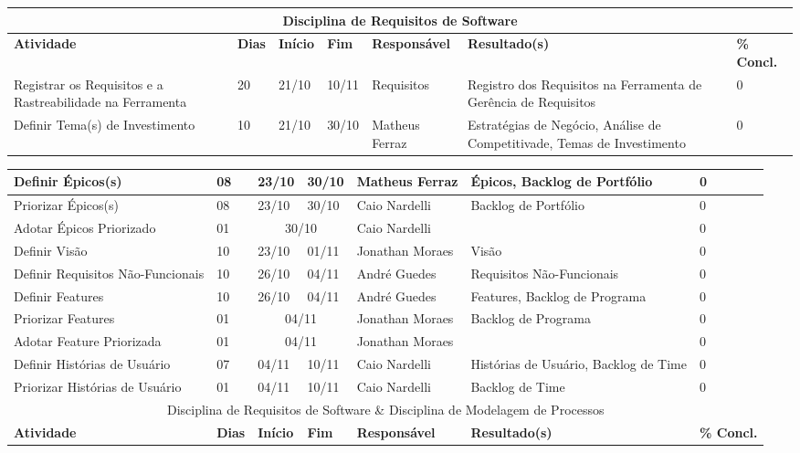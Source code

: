 \begin{landscape}
\begin{center}
\begin{tabular}{|m{6cm}|m{1cm}|m{1cm}|m{1cm}|m{4cm}|m{6cm}|m{2cm}|}
			\multicolumn{7}{|c|}{Disciplina de Requisitos de Software} \\
			\hline
			\textbf{Atividade} & \textbf{Dias} & \textbf{Início} & \textbf{Fim} & \textbf{Responsável} & \textbf{Resultado(s)} & \textbf{\% Concl.} \\ \hline
			Registrar os Requisitos e a Rastreabilidade na Ferramenta & 20 & 21/10 & 10/11 & Requisitos & Registro dos Requisitos na Ferramenta de Gerência de Requisitos & 0 \\ \hline
			Definir Tema(s) de Investimento & 10 & 21/10 & 30/10 & Matheus Ferraz & Estratégias de Negócio, Análise de Competitivade, Temas de Investimento & 0 \\ \hline
			\end{tabular}
		\end{center}
		\begin{center}
			\begin{tabular}{|m{6cm}|m{1cm}|m{1cm}|m{1cm}|m{4cm}|m{6cm}|m{2cm}|}
			\hline
			Definir Épicos(s) & 08 & 23/10 & 30/10 & Matheus Ferraz & Épicos, Backlog de Portfólio & 0 \\ \hline
			Priorizar Épicos(s) & 08 & 23/10 & 30/10 & Caio Nardelli & Backlog de Portfólio & 0 \\ \hline
			Adotar Épicos Priorizado & 01 & \multicolumn{2}{c|}{30/10} & Caio Nardelli & & 0 \\ \hline
			Definir Visão & 10 & 23/10 & 01/11 & Jonathan Moraes & Visão & 0 \\ \hline
			Definir Requisitos Não-Funcionais & 10 & 26/10 & 04/11 & André Guedes & Requisitos Não-Funcionais & 0 \\ \hline
			Definir Features & 10 & 26/10 & 04/11 & André Guedes & Features, Backlog de Programa & 0 \\ \hline
			Priorizar Features & 01 & \multicolumn{2}{c|}{04/11} & Jonathan Moraes & Backlog de Programa & 0 \\ \hline
			Adotar Feature Priorizada & 01 & \multicolumn{2}{c|}{04/11} & Jonathan Moraes & & 0 \\ \hline
			Definir Histórias de Usuário & 07 & 04/11 & 10/11 & Caio Nardelli & Histórias de Usuário, Backlog de Time & 0 \\ \hline
			Priorizar Histórias de Usuário & 01 & 04/11 & 10/11 & Caio Nardelli & Backlog de Time & 0 \\ \hline
			\multicolumn{7}{|c|}{Disciplina de Requisitos de Software \& Disciplina de Modelagem de Processos} \\ \hline
			\textbf{Atividade} & \textbf{Dias} & \textbf{Início} & \textbf{Fim} & \textbf{Responsável} & \textbf{Resultado(s)} & \textbf{\% Concl.} \\ \hline

\end{tabular}
\end{center}
\end{landscape}
